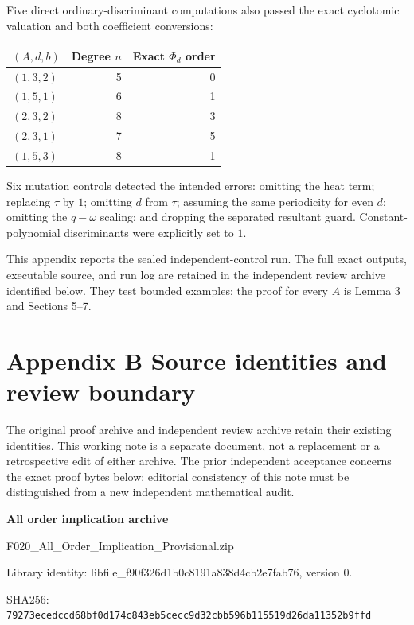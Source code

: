 \documentclass[
  11pt,
]{article}
\begin{document}
Five direct ordinary-discriminant computations also passed the exact
cyclotomic valuation and both coefficient conversions:

\begin{longtable}[]{@{}lrr@{}}
\toprule\noalign{}
\((A,d,b)\) & Degree \(n\) & Exact \(\Phi_d\) order \\
\midrule\noalign{}
\endhead
\bottomrule\noalign{}
\endlastfoot
\((1,3,2)\) & 5 & 0 \\
\((1,5,1)\) & 6 & 1 \\
\((2,3,2)\) & 8 & 3 \\
\((2,3,1)\) & 7 & 5 \\
\((1,5,3)\) & 8 & 1 \\
\end{longtable}

Six mutation controls detected the intended errors: omitting the heat
term; replacing \(\tau\) by \(1\); omitting \(d\) from \(\tau\);
assuming the same periodicity for even \(d\); omitting the \(q-\omega\)
scaling; and dropping the separated resultant guard. Constant-polynomial
discriminants were explicitly set to \(1\).

This appendix reports the sealed independent-control run. The full exact
outputs, executable source, and run log are retained in the independent
review archive identified below. They test bounded examples; the proof
for every \(A\) is Lemma 3 and Sections 5--7.

\section{Appendix B Source identities and review
boundary}\label{appendix-b-source-identities-and-review-boundary}

The original proof archive and independent review archive retain their
existing identities. This working note is a separate document, not a
replacement or a retrospective edit of either archive. The prior
independent acceptance concerns the exact proof bytes below; editorial
consistency of this note must be distinguished from a new independent
mathematical audit.

\textbf{All order implication archive}

F020\_All\_Order\_Implication\_Provisional.zip

Library identity: libfile\_f90f326d1b0c8191a838d4cb2e7fab76, version 0.

SHA256:
\texttt{79273ecedccd68bf0d174c843eb5cecc9d32cbb596b115519d26da11352b9ffd}
\end{document}
